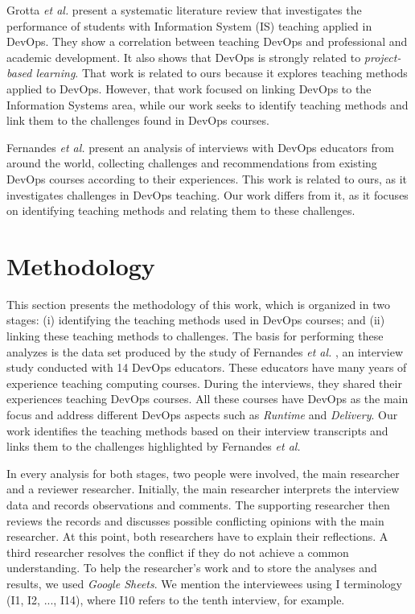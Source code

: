 \documentclass[10pt,conference]{IEEEtran}
\begin{document}
Grotta \textit{et al.} \cite{grotta:2022} present a systematic literature review that investigates the performance of students with Information System (IS) teaching applied in DevOps. They show a correlation between teaching DevOps and professional and academic development. It also shows that DevOps is strongly related to \textsl{project-based learning}. That work is related to ours because it explores teaching methods applied to DevOps. However, that work focused on linking DevOps to the Information Systems area, while our work seeks to identify teaching methods and link them to the challenges found in DevOps courses.


Fernandes \textit{et al.} \cite{fernandes:2022} present an analysis of interviews with DevOps educators from around the world, collecting challenges and recommendations from existing DevOps courses according to their experiences. This work is related to ours, as it investigates challenges in DevOps teaching. Our work differs from it, as it focuses on identifying teaching methods and relating them to these challenges.



\section{Methodology} \label{sec:methodology}

This section presents the methodology of this work, which is organized in two stages: (i) identifying the teaching methods used in DevOps courses; and (ii) linking these teaching methods to challenges. The basis for performing these analyzes is the data set produced by the study of Fernandes \textit{et al.} \cite{fernandes:2022}, an interview study conducted with 14 DevOps educators. These educators have many years of experience teaching computing courses. During the interviews, they shared their experiences teaching DevOps courses. All these courses have DevOps as the main focus and address different DevOps aspects  \cite{leite:2019} such as \textit{Runtime} and \textit{Delivery}. Our work identifies the teaching methods based on their interview transcripts and links them to the challenges highlighted by Fernandes \textit{et al.}

In every analysis for both stages, two people were involved, the main researcher and a reviewer researcher. Initially, the main researcher interprets the interview data and records observations and comments. The supporting researcher then reviews the records and discusses possible conflicting opinions with the main researcher. 
At this point, both researchers have to explain their reflections. A third researcher resolves the conflict if they do not achieve a common understanding. To help the researcher’s work and to store the analyses and results, we used \textit{Google Sheets}. We mention the interviewees using I terminology (I1, I2, ..., I14), where I10 refers to the tenth interview, for example.
\end{document}
